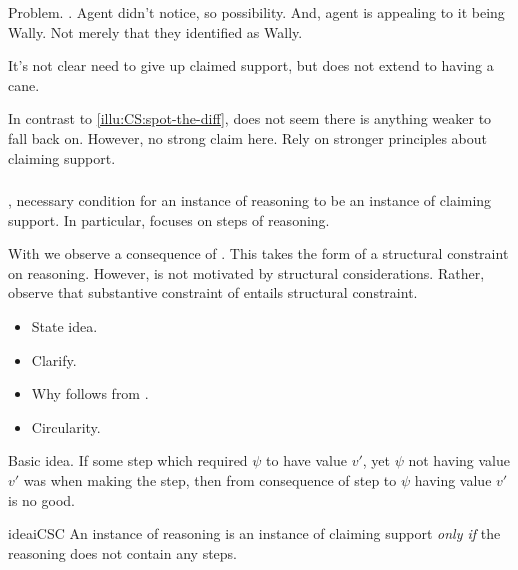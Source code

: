 \begin{note}
  Problem.
  \requ{}.
  Agent didn't notice, so possibility.
  And, agent is appealing to it being Wally.
  Not merely that they identified as Wally.

  It's not clear need to give up claimed support, but does not extend to having a cane.

  In contrast to \ref{illu:CS:spot-the-diff}, does not seem there is anything weaker to fall back on.
  However, no strong claim here.
  Rely on stronger principles about claiming support.
\end{note}




\subsubsection{}
\label{sec:ideaCSC}

\begin{note}
  \ideaCSB{}, necessary condition for an instance of reasoning to be an instance of claiming support.
  In particular, \ideaCSB{} focuses on steps of reasoning.

  With \ideaCSC{} we observe a consequence of \ideaCSB{}.
  This takes the form of a structural constraint on reasoning.
  However, \ideaCSC{} is not motivated by structural considerations.
  Rather, observe that substantive constraint of \ideaCSB{} entails structural constraint.
\end{note}

\begin{note}
  \begin{itemize}
  \item State idea.
  \item Clarify.
  \item Why follows from \ideaCSB{}.
  \item Circularity.
  \end{itemize}
\end{note}

\begin{note}
  Basic idea.
  If some step which required \(\psi\) to have value \(v'\), yet \(\psi\) not having value \(v'\) was \epVAd{} when making the step, then from consequence of step to \(\psi\) having value \(v'\) is no good.
\end{note}

\begin{note}
  \begin{restatable}{idea}{iCSC}
    \label{idea:cs:imp-stp}
    An instance of reasoning is an instance of claiming support \emph{only if} the reasoning does not contain any  steps.
  \end{restatable}
\end{note}

